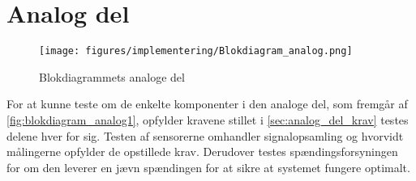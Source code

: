 \section{Analog del}
\begin{figure}[H]
\centering
\texttt{[image: figures/implementering/Blokdiagram\_analog.png]}
\caption{Blokdiagrammets analoge del}
\label{fig:blokdiagram_analog1}
\end{figure}


For at kunne teste om de enkelte komponenter i den analoge del, som fremgår af \autoref{fig:blokdiagram_analog1}, opfylder kravene stillet i \autoref{sec:analog_del_krav} testes delene hver for sig. Testen af sensorerne omhandler signalopsamling og hvorvidt målingerne opfylder de opstillede krav. Derudover testes spændingsforsyningen for om den leverer en jævn spændingen for at sikre at systemet fungere optimalt. 